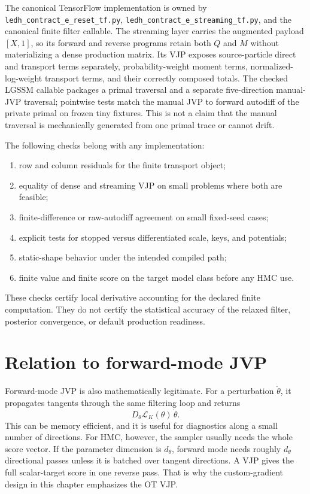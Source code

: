 The canonical TensorFlow implementation is owned by
\texttt{ledh\_contract\_e\_reset\_tf.py},
\texttt{ledh\_contract\_e\_streaming\_tf.py}, and the canonical finite filter
callable.  The streaming layer carries the augmented payload \([X,1]\), so its
forward and reverse programs retain both \(Q\) and \(M\) without materializing a
dense production matrix.  Its VJP exposes source-particle direct and transport
terms separately, probability-weight moment terms, normalized-log-weight
transport terms, and their correctly composed totals.  The checked LGSSM
callable packages a primal traversal and a separate five-direction manual-JVP
traversal; pointwise tests match the manual JVP to forward autodiff of the
private primal on frozen tiny fixtures.  This is not a claim that the manual
traversal is mechanically generated from one primal trace or cannot drift.

The following checks belong with any implementation:
\begin{enumerate}[label=(\arabic*)]
  \item row and column residuals for the finite transport object;
  \item equality of dense and streaming VJP on small problems where both are
  feasible;
  \item finite-difference or raw-autodiff agreement on small fixed-seed cases;
  \item explicit tests for stopped versus differentiated scale, keys, and
  potentials;
  \item static-shape behavior under the intended compiled path;
  \item finite value and finite score on the target model class before any HMC
  use.
\end{enumerate}

These checks certify local derivative accounting for the declared finite
computation.  They do not certify the statistical accuracy of the relaxed
filter, posterior convergence, or default production readiness.

\section{Relation to forward-mode JVP}
\label{sec:bf-ledh-ot-jvp}

Forward-mode JVP is also mathematically legitimate.  For a perturbation
\(\dot\theta\), it propagates tangents through the same filtering loop and
returns
\[
  D_\theta\mathcal L_K(\theta)\,\dot\theta .
\]
This can be memory efficient, and it is useful for diagnostics along a small
number of directions.  For HMC, however, the sampler usually needs the whole
score vector.  If the parameter dimension is \(d_\theta\), forward mode needs
roughly \(d_\theta\) directional passes unless it is batched over tangent
directions.  A VJP gives the full scalar-target score in one reverse pass.  That
is why the custom-gradient design in this chapter emphasizes the OT VJP.

